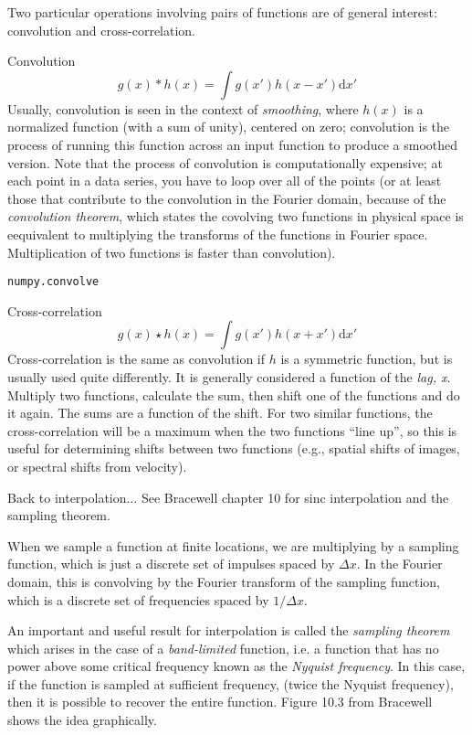 \documentclass[12pt]{article}
\begin{document}
Two particular operations involving pairs of functions are of general interest:
convolution and cross-correlation.

\begin{itemize*}
    \item Convolution
        $$ g(x) * h(x) = \int g(x')h(x-x') \mathrm{d}x' $$
        Usually, convolution is seen in the context of \emph{smoothing}, where $h(x)$ is
        a normalized function (with a sum of unity), centered on zero; convolution is
        the process of running this function across an input function to produce a
        smoothed version. Note that the process of convolution is computationally
        expensive; at each point in a data series, you have to loop over all of the
        points (or at least those that contribute to the convolution in the Fourier
        domain, because of the \emph{convolution theorem}, which states the covolving
        two functions in physical space is eequivalent to multiplying the transforms
        of the functions in Fourier space. Multiplication of two functions is faster
        than convolution).

        \texttt{numpy.convolve}

    \item Cross-correlation
        $$ g(x) \star h(x) = \int g(x')h(x+x') \mathrm{d}x' $$
        Cross-correlation is the same as convolution if $h$ is a symmetric function,
        but is usually used quite differently. It is generally considered a function of
        the \emph{lag, x}. Multiply two functions, calculate the sum, then shift one
        of the functions and do it again. The sums are a function of the shift. For
        two similar functions, the cross-correlation will be a maximum when the two
        functions ``line up'', so this is useful for determining shifts between two
        functions (e.g., spatial shifts of images, or spectral shifts from velocity).
\end{itemize*}

Back to interpolation$\ldots$ See Bracewell chapter 10 for sinc interpolation and
the sampling theorem.

When we sample a function at finite locations, we are multiplying by a
sampling function, which is just a discrete set of impulses spaced by
$\Delta x$. In the Fourier domain, this is convolving by the Fourier
transform of the sampling function, which is a discrete set of
frequencies spaced by $1/\Delta x$.

An important and useful result for interpolation is called the
\emph{sampling theorem} which arises in the case of a
\emph{band-limited} function,
i.e. a function that has no power above some critical frequency
known as the \emph{Nyquist frequency}.
In this case, if the function is sampled at sufficient frequency,
(twice the Nyquist frequency), then it is possible to
recover the entire function. Figure 10.3 from Bracewell shows the idea
graphically.
\end{document}
